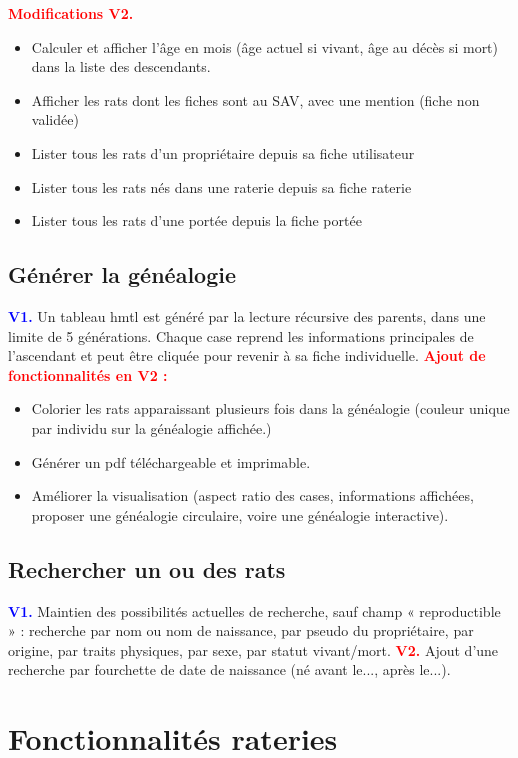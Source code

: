 ﻿\documentclass[a4paper,10pt]{article}
\newcommand\existant[1]{\noindent\textbf{\textcolor{blue}{#1}}}
\newcommand\desire[1]{\noindent\textbf{\textcolor{red}{#1}}}
\begin{document}
\desire{Modifications V2.}
\begin{itemize}
\item Calculer et afficher l'âge en mois (âge actuel si vivant, âge au décès si mort) dans la liste des descendants.
\item Afficher les rats dont les fiches sont au SAV, avec une mention (fiche non validée) 
\item Lister tous les rats d'un propriétaire depuis sa fiche utilisateur
\item Lister tous les rats nés dans une raterie depuis sa fiche raterie
\item Lister tous les rats d'une portée depuis la fiche portée
\end{itemize}

\subsection{Générer la généalogie}
\existant{V1.} Un tableau hmtl est généré par la lecture récursive des parents, dans une limite de 5 générations. Chaque case reprend les informations principales de l'ascendant et peut être cliquée pour revenir à sa fiche individuelle. 
\desire{Ajout de fonctionnalités en V2 :} 
\begin{itemize}
\item Colorier les rats apparaissant plusieurs fois dans la généalogie (couleur unique par individu sur la généalogie affichée.)
\item Générer un pdf téléchargeable et imprimable.
\item Améliorer la visualisation (aspect ratio des cases, informations affichées, proposer une généalogie circulaire, voire une généalogie interactive).
\end{itemize}

\subsection{Rechercher un ou des rats}

\existant{V1.} Maintien des possibilités actuelles de recherche, sauf champ « reproductible » : recherche par nom ou nom de naissance, par pseudo du propriétaire, par origine, par traits physiques, par sexe, par statut vivant/mort.
\desire{V2.} Ajout d'une recherche par fourchette de date de naissance (né avant le..., après le...).

\section{Fonctionnalités rateries}
\end{document}
